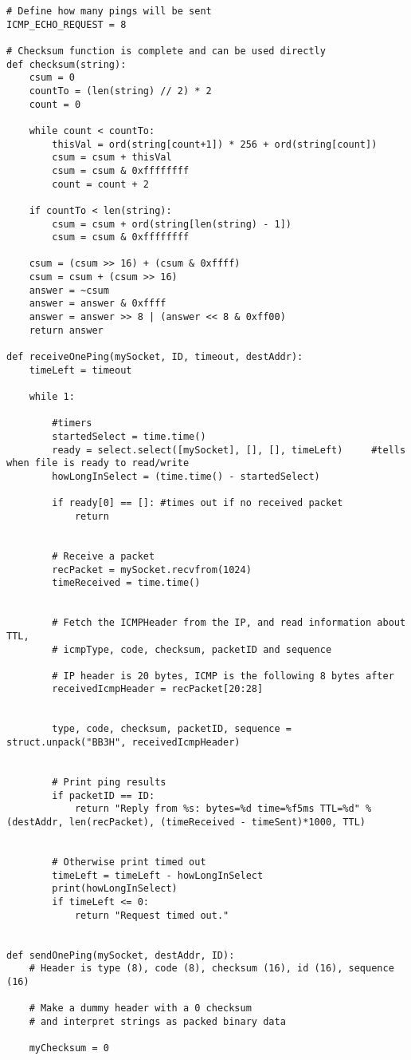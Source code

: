 \documentclass[12pt]{article}
\begin{document}
\begin{enumerate}
\begin{verbatim}
# Define how many pings will be sent
ICMP_ECHO_REQUEST = 8		

# Checksum function is complete and can be used directly
def checksum(string): 
	csum = 0
	countTo = (len(string) // 2) * 2  
	count = 0

	while count < countTo:
		thisVal = ord(string[count+1]) * 256 + ord(string[count]) 
		csum = csum + thisVal 
		csum = csum & 0xffffffff  
		count = count + 2
	
	if countTo < len(string):
		csum = csum + ord(string[len(string) - 1])
		csum = csum & 0xffffffff 
	
	csum = (csum >> 16) + (csum & 0xffff)
	csum = csum + (csum >> 16)
	answer = ~csum 
	answer = answer & 0xffff 
	answer = answer >> 8 | (answer << 8 & 0xff00)
	return answer 
	
def receiveOnePing(mySocket, ID, timeout, destAddr):
	timeLeft = timeout
	
	while 1: 	
		
		#timers
		startedSelect = time.time()
		ready = select.select([mySocket], [], [], timeLeft)		#tells when file is ready to read/write
		howLongInSelect = (time.time() - startedSelect)
		
		if ready[0] == []: #times out if no received packet
			return


		# Receive a packet
		recPacket = mySocket.recvfrom(1024)
		timeReceived = time.time()


		# Fetch the ICMPHeader from the IP, and read information about TTL, 
		# icmpType, code, checksum, packetID and sequence

		# IP header is 20 bytes, ICMP is the following 8 bytes after
		receivedIcmpHeader = recPacket[20:28]


		type, code, checksum, packetID, sequence = struct.unpack("BB3H", receivedIcmpHeader)


		# Print ping results
		if packetID == ID:
			return "Reply from %s: bytes=%d time=%f5ms TTL=%d" % (destAddr, len(recPacket), (timeReceived - timeSent)*1000, TTL)
		

		# Otherwise print timed out
		timeLeft = timeLeft - howLongInSelect
		print(howLongInSelect)
		if timeLeft <= 0:
			return "Request timed out."

	
def sendOnePing(mySocket, destAddr, ID):
	# Header is type (8), code (8), checksum (16), id (16), sequence (16)

	# Make a dummy header with a 0 checksum
	# and interpret strings as packed binary data

	myChecksum = 0


\end{verbatim}
\end{enumerate}
\end{document}
